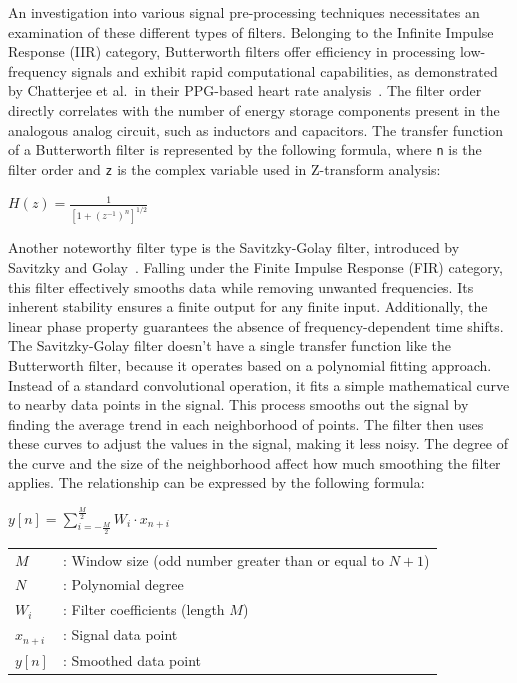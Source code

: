 An investigation into various signal pre-processing techniques necessitates an examination of these different types of filters.
Belonging to the Infinite Impulse Response (IIR) category, Butterworth filters offer efficiency in processing low-frequency signals and exhibit rapid computational capabilities, as demonstrated by Chatterjee et al.\ in their PPG-based heart rate analysis~\cite{chatterjeePPGBasedHeart2018}.
The filter order directly correlates with the number of energy storage components present in the analogous analog circuit, such as inductors and capacitors.
The transfer function of a Butterworth filter is represented by the following formula, where \texttt{n} is the filter order and \texttt{z} is the complex variable used in Z-transform analysis:

\Large
\begin{center}
    \begin{math}
        H(z) = \frac{1}{[1 + (z^{-1})^{n}]^{1/2}}
    \end{math}
\end{center}
\normalsize

Another noteworthy filter type is the Savitzky-Golay filter, introduced by Savitzky and Golay~\cite{savitzkySmoothingDifferentiationData1964}.
Falling under the Finite Impulse Response (FIR) category, this filter effectively smooths data while removing unwanted frequencies.
Its inherent stability ensures a finite output for any finite input.
Additionally, the linear phase property guarantees the absence of frequency-dependent time shifts.
The Savitzky-Golay filter doesn't have a single transfer function like the Butterworth filter, because it operates based on a polynomial fitting approach.
Instead of a standard convolutional operation, it fits a simple mathematical curve to nearby data points in the signal.
This process smooths out the signal by finding the average trend in each neighborhood of points.
The filter then uses these curves to adjust the values in the signal, making it less noisy.
The degree of the curve and the size of the neighborhood affect how much smoothing the filter applies.
The relationship can be expressed by the following formula:

\begin{center}
    \Large
    \begin{math}
        y[n] = \sum_{i=-\frac{M}{2}}^{\frac{M}{2}} W_i \cdot x_{n+i}
    \end{math}

    \normalsize
    \begin{tabular}{ll}
        $M$       & : Window size (odd number greater than or equal to $N+1$) \\
        $N$       & : Polynomial degree                                       \\
        $W_i$     & : Filter coefficients (length $M$)                        \\
        $x_{n+i}$ & : Signal data point                                       \\
        $y[n]$    & : Smoothed data point
    \end{tabular}
\end{center}

